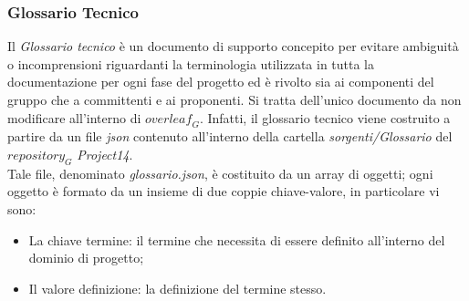 \subsubsection{Glossario Tecnico}
Il \emph{Glossario tecnico} è un documento di supporto concepito per evitare ambiguità o incomprensioni riguardanti la terminologia utilizzata in tutta la documentazione per ogni fase del progetto ed è rivolto sia ai componenti del gruppo che a committenti e ai proponenti.
Si tratta dell'unico documento da non modificare all'interno di $\textit{overleaf}_G$. Infatti, il glossario tecnico viene costruito a partire da un file \emph{json} contenuto all'interno della cartella \emph{sorgenti/Glossario} del $\textit{repository}_G$ \emph{Project14}.\\
Tale file, denominato \emph{glossario.json}, è costituito da un array di oggetti; ogni oggetto è formato da un insieme di due coppie chiave-valore, in particolare vi sono:
\begin{itemize}
    \item La chiave termine: il termine che necessita di essere definito all'interno del dominio di progetto;
    \item Il valore definizione: la definizione del termine stesso.
\end{itemize}
